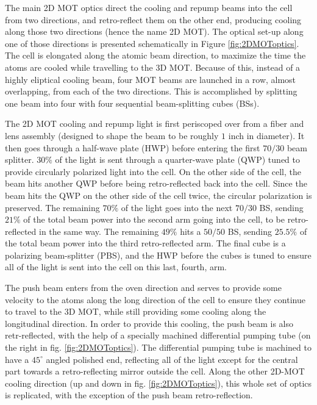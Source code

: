 The main 2D MOT optics direct the cooling and repump beams into the cell from two directions, and retro-reflect them on the other end, producing cooling along those two directions (hence the name 2D MOT). The optical set-up along one of those directions is presented schematically in Figure \ref{fig:2DMOToptics}. The cell is elongated along the atomic beam direction, to maximize the time the atoms are cooled while travelling to the 3D MOT. Because of this, instead of a highly eliptical cooling beam, four MOT beams are launched in a row, almost overlapping, from each of the two directions. This is accomplished by splitting one beam into four with four sequential beam-splitting cubes (BSs). 

The 2D MOT cooling and repump light is first periscoped over from a fiber and lens assembly (designed to shape the beam to be roughly $1$ inch in diameter). It then goes through a half-wave plate (HWP) before entering the first $70/30$ beam splitter. $30\%$ of the light is sent through a quarter-wave plate (QWP) tuned to provide circularly polarized light into the cell. On the other side of the cell, the beam hits another QWP before being retro-reflected back into the cell. Since the beam hits the QWP on the other side of the cell twice, the circular polarization is preserved.  The remaining  $70\%$ of the light goes into the next $70/30$ BS, sending $21\%$ of the total beam power into the second arm going into the cell, to be retro-reflected in the same way. The remaining $49\%$ hits a $50/50$ BS, sending $25.5\%$ of the total beam power into the third retro-reflected arm. The final cube is a polarizing beam-splitter (PBS), and the HWP before the cubes is tuned to ensure all of the light is sent into the cell on this last, fourth, arm. 

The push beam enters from the oven direction and serves to provide some velocity to the atoms along the long direction of the cell to ensure they continue to travel to the 3D MOT, while still providing some cooling along the longitudinal direction. In order to provide this cooling, the push beam is also retr-reflected, with the help of a specially machined differential pumping tube (on the right in fig.  \ref{fig:2DMOToptics}). The differential pumping tube is machined to have a $45^{\circ}$ angled polished end, reflecting all of the light except for the central part towards a retro-reflecting mirror outside the cell. Along the other 2D-MOT cooling direction (up and down in fig.  \ref{fig:2DMOToptics}), this whole set of optics is replicated, with the exception of the push beam retro-reflection.   

